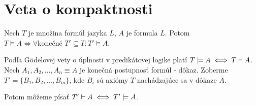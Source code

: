 \section{Veta o kompaktnosti}

\begin{veta}[O kompaktnosti]
    Nech $T$ je množina formúl jazyka $L$, $A$ je formula $L$. Potom
    $T \models A \iff \forall \mbox{konečné }T'\subseteq T: T' \models A$.
\end{veta}

\begin{dokaz}
    Podľa G\"odelovej vety o úplnosti v predikátovej logike platí
    $T \models A \iff T \vdash A$.
    Nech $A_1, A_2, \dots , A_n \equiv A$ je konečná postupnosť formúl -
    dôkaz. Zoberme $T' = \{B_1, B_2, \dots, B_m\}$, kde $B_i$ sú axiómy
    $T$ nachádzajúce sa v dôkaze $A$.

    Potom môžeme písať $T' \vdash A \iff T' \models A$.
\end{dokaz}

